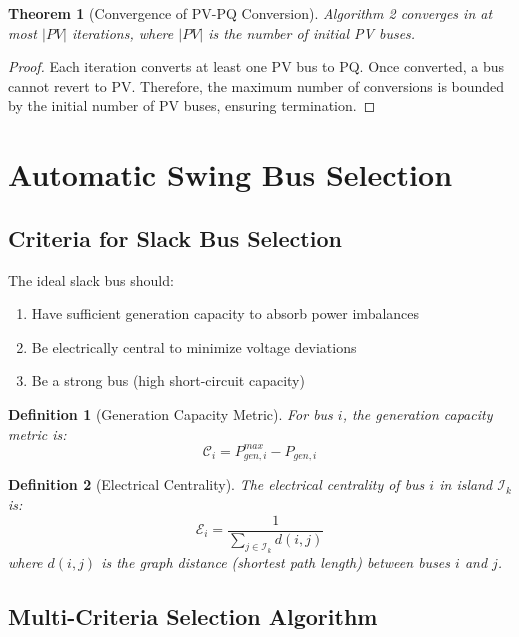 \documentclass[11pt]{article}
\newtheorem{theorem}{Theorem}
\newtheorem{definition}{Definition}
\begin{document}
\begin{theorem}[Convergence of PV-PQ Conversion]
Algorithm 2 converges in at most $|PV|$ iterations, where $|PV|$ is the number of initial PV buses.
\end{theorem}

\begin{proof}
Each iteration converts at least one PV bus to PQ. Once converted, a bus cannot revert to PV. Therefore, the maximum number of conversions is bounded by the initial number of PV buses, ensuring termination.
\end{proof}

\section{Automatic Swing Bus Selection}

\subsection{Criteria for Slack Bus Selection}

The ideal slack bus should:
\begin{enumerate}
    \item Have sufficient generation capacity to absorb power imbalances
    \item Be electrically central to minimize voltage deviations
    \item Be a strong bus (high short-circuit capacity)
\end{enumerate}

\begin{definition}[Generation Capacity Metric]
For bus $i$, the generation capacity metric is:
\begin{equation}
\mathcal{C}_i = P_{gen,i}^{max} - P_{gen,i}
\end{equation}
\end{definition}

\begin{definition}[Electrical Centrality]
The electrical centrality of bus $i$ in island $\mathcal{I}_k$ is:
\begin{equation}
\mathcal{E}_i = \frac{1}{\sum_{j \in \mathcal{I}_k} d(i,j)}
\end{equation}
where $d(i,j)$ is the graph distance (shortest path length) between buses $i$ and $j$.
\end{definition}

\subsection{Multi-Criteria Selection Algorithm}
\end{document}
